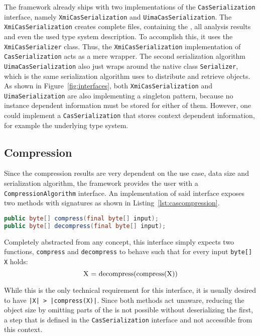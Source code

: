 The framework already ships with two implementations of the \lstinline|CasSerialization| interface, namely \lstinline|XmiCasSerialization| and \lstinline|UimaCasSerialization|. The \lstinline|XmiCasSerialization| creates complete \xmi{} files, containing the \sofa{}, all analysis results and even the used type system description. To accomplish this, it uses the \uima{} \lstinline|XmiCasSerializer| class. Thus, the \lstinline|XmiCasSerialization| implementation of \lstinline|CasSerialization| acts as a mere wrapper. The second serialization algorithm \lstinline|UimaCasSerialization| also just wraps around the native \uima{} class \lstinline|Serializer|, which is the same serialization algorithm \uimaas{} uses to distribute and retrieve \cas{} objects. As shown in Figure~\ref{fig:interfaces}, both \lstinline|XmiCasSerialization| and \lstinline|UimaSerialization| are also implementing a singleton pattern, because no instance dependent information must be stored for either of them. However, one could implement a \lstinline|CasSerialization| that stores context dependent information, for example the underlying type system.

\subsection{Compression}
Since the compression results are very dependent on the use case, data size and serialization algorithm, the framework provides the user with a \lstinline|CompressionAlgorithm| interface. An implementation of said interface exposes two methods with signatures as shown in Listing~\ref{lst:cascompression}.
\begin{lstlisting}[language=Java,caption={CompressionAlgorithm method signatures},label=lst:cascompression,float]
public byte[] compress(final byte[] input);
public byte[] decompress(final byte[] input);
\end{lstlisting}
Completely abstracted from any \uima{} concept, this interface simply expects two functions, \lstinline|compress| and \lstinline|decompress| to behave such that for every input \lstinline|byte[] X| holds: 
\[\text{\lstinline|X = decompress(compress(X))|}\]

While this is the only technical requirement for this interface, it is usually desired to have \lstinline+|X| > |compress(X)|+. Since both methods act \uima{} unaware, reducing the object size by omitting parts of the \cas{} is not possible without deserializing the \cas{} first, a step that is defined in the \lstinline|CasSerialization| interface and not accessible from this context. 

